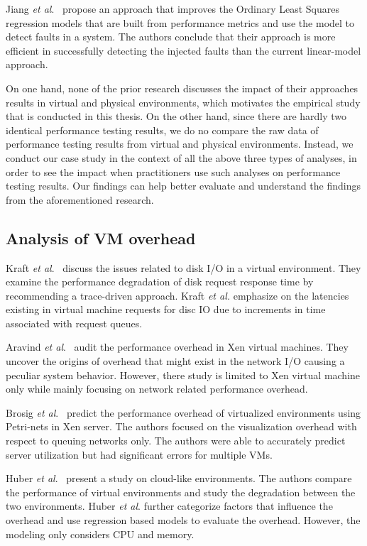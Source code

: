 Jiang \emph{et al$.$}~\cite{Jiang:2009:SMM:1555228.1555233} propose an approach that improves the Ordinary Least Squares regression models that are built from performance metrics and use the model to detect faults in a system. The authors conclude that their approach is more efficient in successfully detecting the injected faults than the current linear-model approach.

On one hand, none of the prior research discusses the impact of their approaches results in virtual and physical environments, which motivates the empirical study that is conducted in this thesis. On the other hand, since there are hardly two identical performance testing results, we do no compare the raw data of performance testing results from virtual and physical environments. Instead, we conduct our case study in the context of all the above three types of analyses, in order to see the impact when practitioners use such analyses on performance testing results. Our findings can help better evaluate and understand the findings from the aforementioned research. 



\subsection{Analysis of VM overhead}

Kraft \textit{et al$.$}~\cite{kraft2011io} discuss the issues related to disk I/O in a virtual environment. They examine the performance degradation of disk request response time by recommending a trace-driven approach. Kraft \textit{et al.} emphasize on the latencies existing in virtual machine requests for disc IO due to increments in time associated with request queues. 

Aravind \textit{et al$.$}~\cite{menon2005diagnosing} audit the performance overhead in Xen virtual machines. They uncover the origins of overhead that might exist in the network I/O causing a peculiar system behavior. However, there study is limited to Xen virtual machine only while mainly focusing on network related performance overhead.

Brosig \textit{et al$.$}~\cite{brosig2013evaluating} predict the performance overhead of virtualized environments using Petri-nets in Xen server. The authors focused on the visualization overhead with respect to queuing networks only. The authors were able to accurately predict server utilization but had significant errors for multiple VMs.


Huber \textit{et al$.$}~\cite{huber2011evaluating} present a study on cloud-like environments. The authors compare the performance of virtual environments and study the degradation between the two environments. Huber \textit{et al$.$} further categorize factors that influence the overhead and use regression based models to evaluate the overhead. However, the modeling only considers CPU and memory.


